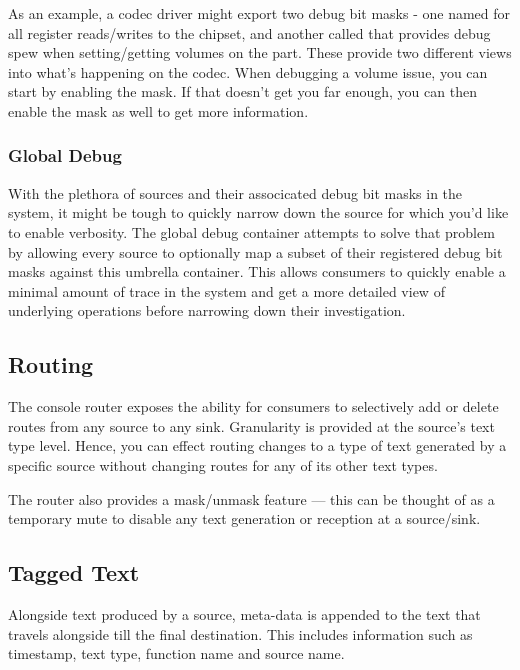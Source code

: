 As an example, a codec driver might export two debug bit masks - one named  for all register
reads/writes to the chipset, and another called  that provides debug spew when setting/getting volumes 
on the part. These provide two different views into what's happening on the codec. When debugging a volume 
issue, you can start by enabling the  mask. If that doesn't get you far enough, you can then enable 
the  mask as well to get more information.

\subsubsection{Global Debug}

With the plethora of sources and their associcated debug bit masks in the system, it might be tough to quickly narrow 
down the source for which you'd like to enable verbosity. The global debug container attempts to solve that problem by allowing 
every source to optionally map a subset of their registered debug bit masks against this umbrella container. This allows consumers to quickly enable 
a minimal amount of trace in the system and get a more detailed view of underlying operations before narrowing down their 
investigation. 

\subsection{Routing}

The console router exposes the ability for consumers to selectively add or delete routes from any source to any sink.
Granularity is provided at the source's text type level. Hence, you can effect routing changes to a
type of text generated by a specific source without changing routes for any of its other text types.

The router also provides a mask/unmask feature --- this can be thought of as a temporary mute to disable any text generation
or reception at a source/sink. 

\subsection{Tagged Text}

Alongside text produced by a source, meta-data is appended to the text that travels alongside till the final destination. 
This includes information such as timestamp, text type, function name and source name.

